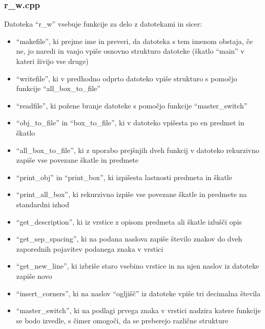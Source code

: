 \documentclass[12pt, a4paper, notitlepage]{article}
\begin{document}
      \subsubsection{r\_w.cpp}
      Datoteka ``r\_w'' vsebuje funkcije za delo z datotekami in sicer:
      \begin{itemize}
        \item ``makefile'', ki prejme ime in preveri, da datoteka s tem imenom obstaja, če ne, jo naredi in vanjo vpiše osnovno strukturo datoteke (škatlo ``main'' v kateri živijo vse druge)
        \item ``writefile'', ki v predhodno odprto datoteko vpiše strukturo s pomočjo funkcije ``all\_box\_to\_file''
        \item ``readfile'', ki požene branje datoteke s pomočjo funkcije ``master\_switch''
        \item ``obj\_to\_file'' in ``box\_to\_file'', ki v datoteko vpišesta po en predmet in škatlo
        \item ``all\_box\_to\_file'', ki z uporabo prejšnjih dveh funkcij v datoteko rekurzivno zapiše vse povezane škatle in predmete
        \item ``print\_obj'' in ``print\_box'', ki izpišesta lastnosti predmeta in škatle
        \item ``print\_all\_box'', ki rekurzivno izpiše vse povezane škatle in predmete na standardni izhod
        \item ``get\_description'', ki iz vrstice z opisom predmeta ali škatle izlušči opis
        \item ``get\_sep\_spacing'', ki na podana naslova zapiše število znakov do dveh zaporednih pojavitev podanega znaka v vrstici
        \item ``get\_new\_line'', ki izbriše staro vsebino vrstice in na njen naslov iz datoteke zapiše novo
        \item ``insert\_corners'', ki na naslov ``ogljišč'' iz datoteke vpiše tri decimalna števila
        \item ``master\_switch'', ki na podlagi prvega znaka v vrstici nadzira katere funkcije se bodo izvedle, s čimer omogoči, da se preberejo različne strukture
      \end{itemize}
\end{document}
